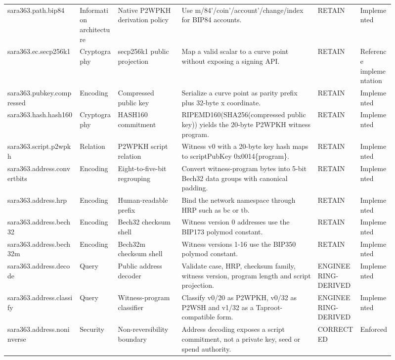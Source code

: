 \begin{longtable}{@{}p{0.17\linewidth} p{0.09\linewidth} p{0.15\linewidth} p{0.32\linewidth} p{0.10\linewidth} p{0.08\linewidth}@{}}
\addlinespace[1.5pt]
sara363.path.bip84 & Information architecture & Native P2WPKH derivation policy & Use m/84'/coin'/account'/change/index for BIP84 accounts. & RETAIN & Implemented\\
\addlinespace[1.5pt]
sara363.ec.secp256k1 & Cryptography & secp256k1 public projection & Map a valid scalar to a curve point without exposing a signing API. & RETAIN & Reference implementation\\
\addlinespace[1.5pt]
sara363.pubkey.compressed & Encoding & Compressed public key & Serialize a curve point as parity prefix plus 32-byte x coordinate. & RETAIN & Implemented\\
\addlinespace[1.5pt]
sara363.hash.hash160 & Cryptography & HASH160 commitment & RIPEMD160(SHA256(compressed public key)) yields the 20-byte P2WPKH witness program. & RETAIN & Implemented\\
\addlinespace[1.5pt]
sara363.script.p2wpkh & Relation & P2WPKH script relation & Witness v0 with a 20-byte key hash maps to scriptPubKey 0x0014\{program\}. & RETAIN & Implemented\\
\addlinespace[1.5pt]
sara363.address.convertbits & Encoding & Eight-to-five-bit regrouping & Convert witness-program bytes into 5-bit Bech32 data groups with canonical padding. & RETAIN & Implemented\\
\addlinespace[1.5pt]
sara363.address.hrp & Encoding & Human-readable prefix & Bind the network namespace through HRP such as bc or tb. & RETAIN & Implemented\\
\addlinespace[1.5pt]
sara363.address.bech32 & Encoding & Bech32 checksum shell & Witness version 0 addresses use the BIP173 polymod constant. & RETAIN & Implemented\\
\addlinespace[1.5pt]
sara363.address.bech32m & Encoding & Bech32m checksum shell & Witness versions 1-16 use the BIP350 polymod constant. & RETAIN & Implemented\\
\addlinespace[1.5pt]
sara363.address.decode & Query & Public address decoder & Validate case, HRP, checksum family, witness version, program length and script projection. & ENGINEERING-DERIVED & Implemented\\
\addlinespace[1.5pt]
sara363.address.classify & Query & Witness-program classifier & Classify v0/20 as P2WPKH, v0/32 as P2WSH and v1/32 as a Taproot-compatible form. & ENGINEERING-DERIVED & Implemented\\
\addlinespace[1.5pt]
sara363.address.noninverse & Security & Non-reversibility boundary & Address decoding exposes a script commitment, not a private key, seed or spend authority. & CORRECTED & Enforced\\

\end{longtable}
